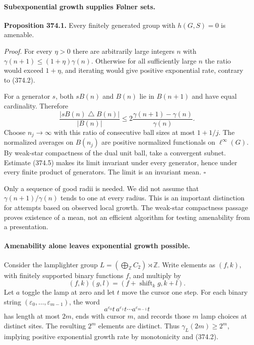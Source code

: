\documentclass[11pt]{article}
\begin{document}
\paragraph{Subexponential growth supplies Følner sets.}
\textbf{Proposition 374.1.} Every finitely generated group with
$h(G,S)=0$ is amenable.

\emph{Proof.} For every $\eta>0$ there are arbitrarily large integers
$n$ with
$\gamma(n+1)\le(1+\eta)\gamma(n)$. Otherwise for all sufficiently
large $n$ the ratio would exceed $1+\eta$, and iterating would give
positive exponential rate, contrary to (374.2).

For a generator $s$, both $sB(n)$ and $B(n)$ lie in $B(n+1)$ and
have equal cardinality. Therefore
\[
 \frac{|sB(n)\mathbin\triangle B(n)|}{|B(n)|}
 \le2\frac{\gamma(n+1)-\gamma(n)}{\gamma(n)}.
 \tag{374.5}
\]
Choose $n_j\to\infty$ with this ratio of consecutive ball sizes
at most $1+1/j$. The normalized averages on $B(n_j)$ are positive
normalized functionals on $\ell^\infty(G)$. By weak-star compactness
of the dual unit ball, take a convergent subnet. Estimate (374.5)
makes its limit invariant under every generator, hence under every
finite product of generators. The limit is an invariant mean.
\hfill$\square$

Only a sequence of good radii is needed. We did not assume that
$\gamma(n+1)/\gamma(n)$ tends to one at every radius. This is an
important distinction for attempts based on observed local growth.
The weak-star compactness passage proves existence of a mean, not an
efficient algorithm for testing amenability from a presentation.

\paragraph{Amenability alone leaves exponential growth possible.}
Consider the lamplighter group
$L=(\bigoplus_{\mathbb Z}C_2)\rtimes\mathbb Z$. Write elements as
$(f,k)$, with finitely supported binary functions $f$, and multiply by
\[
 (f,k)(g,l)=(f+\operatorname{shift}_k g,k+l).
\]
Let $a$ toggle the lamp at zero and let $t$ move the cursor one step.
For each binary string $(\varepsilon_0,\ldots,\varepsilon_{m-1})$,
the word
\[
 a^{\varepsilon_0}t\,a^{\varepsilon_1}t\cdots
                         a^{\varepsilon_{m-1}}t
\]
has length at most $2m$, ends with cursor $m$, and records those
$m$ lamp choices at distinct sites. The resulting $2^m$ elements
are distinct. Thus $\gamma_L(2m)\ge2^m$, implying positive
exponential growth rate by monotonicity and (374.2).
\end{document}
